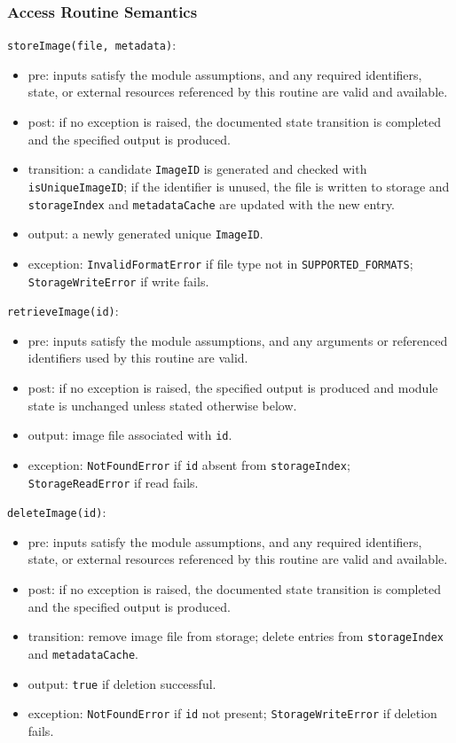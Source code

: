 \documentclass[12pt, titlepage]{article}
\begin{document}
\subsubsection{Access Routine Semantics}

\noindent \texttt{storeImage(file, metadata)}:
\begin{itemize}
    \item pre: inputs satisfy the module assumptions, and any required identifiers, state, or external resources referenced by this routine are valid and available.
    \item post: if no exception is raised, the documented state transition is completed and the specified output is produced.
    \item transition: a candidate \texttt{ImageID} is generated and checked with \texttt{isUniqueImageID}; if the identifier is unused, the file is written to storage and \texttt{storageIndex} and \texttt{metadataCache} are updated with the new entry.
    \item output: a newly generated unique \texttt{ImageID}.
    \item exception: \texttt{InvalidFormatError} if file type not in \texttt{SUPPORTED\_FORMATS}; \texttt{StorageWriteError} if write fails.
\end{itemize}

\noindent \texttt{retrieveImage(id)}:
\begin{itemize}
    \item pre: inputs satisfy the module assumptions, and any arguments or referenced identifiers used by this routine are valid.
    \item post: if no exception is raised, the specified output is produced and module state is unchanged unless stated otherwise below.
    \item output: image file associated with \texttt{id}.
    \item exception: \texttt{NotFoundError} if \texttt{id} absent from \texttt{storageIndex}; \texttt{StorageReadError} if read fails.
\end{itemize}

\noindent \texttt{deleteImage(id)}:
\begin{itemize}
    \item pre: inputs satisfy the module assumptions, and any required identifiers, state, or external resources referenced by this routine are valid and available.
    \item post: if no exception is raised, the documented state transition is completed and the specified output is produced.
    \item transition: remove image file from storage; delete entries from \texttt{storageIndex} and \texttt{metadataCache}.
    \item output: \texttt{true} if deletion successful.
    \item exception: \texttt{NotFoundError} if \texttt{id} not present; \texttt{StorageWriteError} if deletion fails.
\end{itemize}
\end{document}
